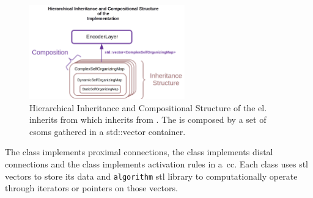 \documentclass[11pt,a4paper]{article}
\newcommand{\CC}{C\nolinebreak\hspace{-.05em}\raisebox{.4ex}{\tiny\bf +}\nolinebreak\hspace{-.10em}\raisebox{.4ex}{\tiny\bf +}}
\begin{document}

\begin{figure}[h!]
    \centering
    \includegraphics[width=0.6\textwidth]{InheritanceComposition.png}
    \caption{Hierarchical Inheritance and Compositional Structure of the \gls{el}.  inherits from  which inherits from . The  is composed by a set of \glspl{csom} gathered    in a std::vector  container.}
    \label{fig:InheritanceComposition}
\end{figure}

The  class implements proximal connections, the  class implements distal connections and the  class implements activation rules in a~\gls{cc}. Each class uses \gls{stl} vectors to store its data and \texttt{algorithm} \gls{stl} library to computationally operate through iterators or pointers on those vectors.

\end{document}
